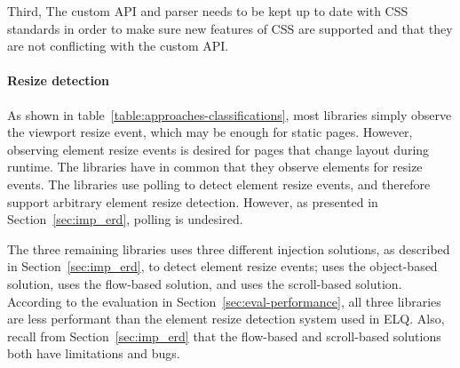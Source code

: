 \documentclass[a4paper,11pt]{kth-mag}
\begin{document}
    Third, The custom \gls{API} and parser needs to be kept up to date with \gls{CSS} standards in order to make sure new features of \gls{CSS} are supported and that they are not conflicting with the custom \gls{API}.

    \paragraph{Resize detection}
    As shown in table~\ref{table:approaches-classifications}, most libraries simply observe the \gls{viewport} resize event, which may be enough for static pages.
    However, observing element resize events is desired for pages that change layout during runtime.
    The libraries \cite{eq_imp_localised-css,eq_imp_selector_queries,eq_imp_prollyfill-min-width,eq_imp_gss,eq_imp_element-queries,eq_imp_css-element-queries} have in common that they observe \glspl{element} for resize events.
    The libraries \cite{eq_imp_localised-css,eq_imp_selector_queries} use polling to detect element resize events, and therefore support arbitrary element resize detection.
    However, as presented in Section~\ref{sec:imp_erd}, polling is undesired.

    The three remaining libraries uses three different injection solutions, as described in Section~\ref{sec:imp_erd}, to detect element resize events; \cite{eq_imp_element-queries} uses the object-based solution, \cite{eq_imp_prollyfill-min-width} uses the flow-based solution, and \cite{eq_imp_css-element-queries} uses the scroll-based solution.
    According to the evaluation in Section~\ref{sec:eval-performance}, all three libraries are less performant than the element resize detection system used in \gls{ELQ}.
    Also, recall from Section~\ref{sec:imp_erd} that the flow-based and scroll-based solutions both have limitations and bugs.
\end{document}
